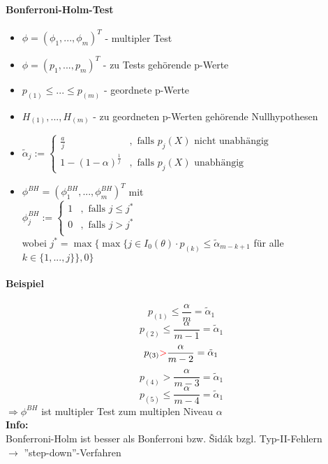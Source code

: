 \paragraph{Bonferroni-Holm-Test}
\begin{itemize}
 \item $\phi=(\phi_1,...,\phi_m)^T $ - multipler Test
 \item $\phi=(p_1,...,p_m)^T $ - zu Tests gehörende p-Werte
 \item $p_{(1)} \leq ... \leq p_{(m)} $ - geordnete p-Werte
 \item $H_{(1)},...,H_{(m)} $ - zu geordneten p-Werten gehörende Nullhypothesen
 \item $\tilde{\alpha}_j := 
	\begin{cases}
	 \frac{a}{j} & , \text{ falls } p_j(X) \text{ nicht unabhängig } \\
	 1-(1-\alpha)^{\frac{1}{j}} & , \text{ falls } p_j(X) \text{ unabhängig }
	\end{cases}
	$
 \item $\phi^{BH}=(\phi_1^{BH},...,\phi_m^{BH})^T$ mit \\
 $\phi_j^{BH} := 
      \begin{cases}
       1 & ,\text{ falls } j \leq j^* \\
       0 & ,\text{ falls } j > j^* \\
      \end{cases}
      $\\
      wobei $j^* =\max\{ \max\{j \in I_0(\theta) \cdot p_{(k)} \leq \tilde{\alpha}_{m-k+1}$ für alle $k \in \{1,...,j\}\}, 0 \}$
\end{itemize}
\paragraph{Beispiel}
\[ p_{(1)} \leq \frac{\alpha}{m} = \tilde{\alpha}_1 \]
\[ p_{(2)} \leq \frac{\alpha}{m-1} = \tilde{\alpha}_1 \]
\[ p_{(3)} \textcolor{red}{>} \frac{\alpha}{m-2} = \tilde{\alpha}_1 \]
\[ p_{(4)} > \frac{\alpha}{m-3} = \tilde{\alpha}_1 \]
\[ p_{(5)} \leq \frac{\alpha}{m-4} = \tilde{\alpha}_1 \]
$\Rightarrow \phi^{BH}$ ist multipler Test zum multiplen Niveau $\alpha$  \\
\textbf{Info:} \\
Bonferroni-Holm ist besser als Bonferroni bzw. \v Sid\'ak bzgl. Typ-II-Fehlern\\
$\rightarrow$ ''step-down''-Verfahren

